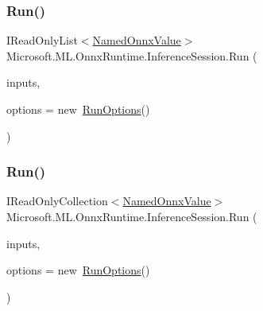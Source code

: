 \subsubsection{\texorpdfstring{Run()}{Run()}\hspace{0.1cm}{\footnotesize\ttfamily [1/4]}}
{\footnotesize\ttfamily I\+Read\+Only\+List$<$\mbox{\hyperlink{classMicrosoft_1_1ML_1_1OnnxRuntime_1_1NamedOnnxValue}{Named\+Onnx\+Value}}$>$ Microsoft.\+M\+L.\+Onnx\+Runtime.\+Inference\+Session.\+Run (\begin{DoxyParamCaption}\item[{I\+Read\+Only\+List$<$ \mbox{\hyperlink{classMicrosoft_1_1ML_1_1OnnxRuntime_1_1NamedOnnxValue}{Named\+Onnx\+Value}} $>$}]{inputs,  }\item[{\mbox{\hyperlink{structMicrosoft_1_1ML_1_1OnnxRuntime_1_1RunOptions}{Run\+Options}}}]{options = {\ttfamily new~\mbox{\hyperlink{structMicrosoft_1_1ML_1_1OnnxRuntime_1_1RunOptions}{Run\+Options}}()} }\end{DoxyParamCaption})\hspace{0.3cm}{\ttfamily [inline]}}

\mbox{\label{classMicrosoft_1_1ML_1_1OnnxRuntime_1_1InferenceSession_a821eafb18fe5c2b806d9a555c84dd0fc}} 
\subsubsection{\texorpdfstring{Run()}{Run()}\hspace{0.1cm}{\footnotesize\ttfamily [2/4]}}
{\footnotesize\ttfamily I\+Read\+Only\+Collection$<$\mbox{\hyperlink{classMicrosoft_1_1ML_1_1OnnxRuntime_1_1NamedOnnxValue}{Named\+Onnx\+Value}}$>$ Microsoft.\+M\+L.\+Onnx\+Runtime.\+Inference\+Session.\+Run (\begin{DoxyParamCaption}\item[{I\+Read\+Only\+Collection$<$ \mbox{\hyperlink{classMicrosoft_1_1ML_1_1OnnxRuntime_1_1NamedOnnxValue}{Named\+Onnx\+Value}} $>$}]{inputs,  }\item[{\mbox{\hyperlink{structMicrosoft_1_1ML_1_1OnnxRuntime_1_1RunOptions}{Run\+Options}}}]{options = {\ttfamily new~\mbox{\hyperlink{structMicrosoft_1_1ML_1_1OnnxRuntime_1_1RunOptions}{Run\+Options}}()} }\end{DoxyParamCaption})\hspace{0.3cm}{\ttfamily [inline]}}

